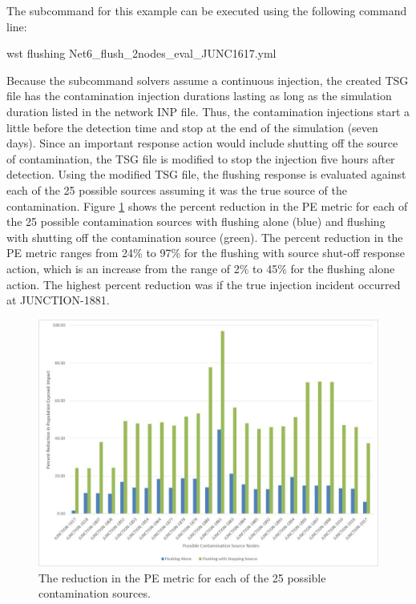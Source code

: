 
The  subcommand for this example can be executed using the following command line:

\begin{unknownListing}
wst flushing Net6_flush_2nodes_eval_JUNC1617.yml
\end{unknownListing}

Because the  subcommand solvers assume a continuous injection, the 
created TSG file has the contamination injection durations lasting as long as the 
simulation duration listed in the network INP file. Thus, the contamination injections 
start a little before the detection time and stop at the end of the simulation 
(seven days). Since an important response action would include shutting off the 
source of contamination, the TSG file is modified to stop the injection five 
hours after detection. Using the modified TSG file, the flushing response is evaluated 
against each of the 25 possible sources assuming it was the true source of the contamination.   
Figure \ref{fig:flushing_pe_reduction} shows the percent reduction in the PE metric 
for each of the 25 possible contamination sources with flushing alone (blue) and 
flushing with shutting off the contamination source (green). The percent 
reduction in the PE metric ranges from 24\% to 97\% for the flushing with source shut-off 
response action, which is an increase from the range of 2\% to 45\% for the flushing alone 
action. The highest percent reduction was if the true injection incident occurred at JUNCTION-1881.

\begin{figure}[h!]
\begin{center}
\includegraphics[scale=0.6]{graphics/flushing_pe_reduction.jpg}
\caption{The reduction in the PE metric for each of the 25 possible contamination sources.}
\label{fig:flushing_pe_reduction}
\end{center}
\end{figure}

 
